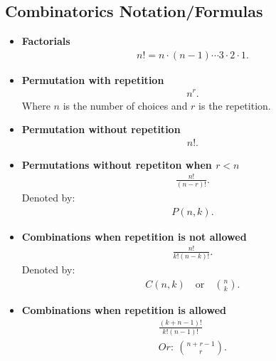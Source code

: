 \documentclass{report}
\begin{document}
      \subsection{\LARGE Combinatorics Notation/Formulas}
      \bigbreak \noindent 
      \begin{itemize}
        \item \textbf{Factorials}
          \begin{align*}
              n! = n \cdot (n-1) \cdots 3 \cdot 2 \cdot 1
          .\end{align*}
        \item \textbf{Permutation with repetition}
          \begin{align*}
            n^{r}
          .\end{align*}
          Where $n$ is the number of choices and $r$ is the repetition.
        \item  \textbf{Permutation without repetition}
          \begin{align*}
            n! 
          .\end{align*}
        \item \textbf{Permutations without repetiton when $r < n$}
           \begin{align*}
             \frac{n!}{(n-r)!}
         .\end{align*} 
         Denoted by:
         \begin{align*}
           P(n,k)
         .\end{align*}
       \item \textbf{Combinations when repetition is not allowed}
       \begin{align*}
           \frac{n!}{k!(n-k)!}
       .\end{align*} 
        Denoted by:
        \begin{align*}
            C(n,k) \quad \text{or}\quad \binom{n}{k}
        .\end{align*}
      \item \textbf{Combinations when repetition is allowed}
        \begin{align*}
             \frac{(k+n-1)!}{k!(n-1)!} \\
             Or:\ \binom{n+r-1}{r}
        .\end{align*}

      \end{itemize}



      
\end{document}
